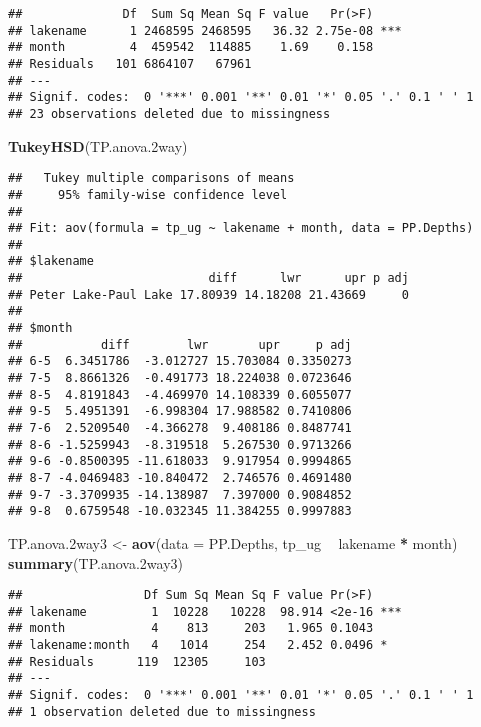 \documentclass[]{article}
\newenvironment{Shaded}{\begin{snugshade}}{\end{snugshade}}
\newcommand{\KeywordTok}[1]{\textcolor[rgb]{0.13,0.29,0.53}{\textbf{#1}}}
\newcommand{\DataTypeTok}[1]{\textcolor[rgb]{0.13,0.29,0.53}{#1}}
\newcommand{\StringTok}[1]{\textcolor[rgb]{0.31,0.60,0.02}{#1}}
\newcommand{\OperatorTok}[1]{\textcolor[rgb]{0.81,0.36,0.00}{\textbf{#1}}}
\newcommand{\NormalTok}[1]{#1}
\begin{document}
\begin{verbatim}
##              Df  Sum Sq Mean Sq F value   Pr(>F)    
## lakename      1 2468595 2468595   36.32 2.75e-08 ***
## month         4  459542  114885    1.69    0.158    
## Residuals   101 6864107   67961                     
## ---
## Signif. codes:  0 '***' 0.001 '**' 0.01 '*' 0.05 '.' 0.1 ' ' 1
## 23 observations deleted due to missingness
\end{verbatim}

\begin{Shaded}
\begin{Highlighting}[]
\KeywordTok{TukeyHSD}\NormalTok{(TP.anova.2way)}
\end{Highlighting}
\end{Shaded}

\begin{verbatim}
##   Tukey multiple comparisons of means
##     95% family-wise confidence level
## 
## Fit: aov(formula = tp_ug ~ lakename + month, data = PP.Depths)
## 
## $lakename
##                          diff      lwr      upr p adj
## Peter Lake-Paul Lake 17.80939 14.18208 21.43669     0
## 
## $month
##           diff        lwr       upr     p adj
## 6-5  6.3451786  -3.012727 15.703084 0.3350273
## 7-5  8.8661326  -0.491773 18.224038 0.0723646
## 8-5  4.8191843  -4.469970 14.108339 0.6055077
## 9-5  5.4951391  -6.998304 17.988582 0.7410806
## 7-6  2.5209540  -4.366278  9.408186 0.8487741
## 8-6 -1.5259943  -8.319518  5.267530 0.9713266
## 9-6 -0.8500395 -11.618033  9.917954 0.9994865
## 8-7 -4.0469483 -10.840472  2.746576 0.4691480
## 9-7 -3.3709935 -14.138987  7.397000 0.9084852
## 9-8  0.6759548 -10.032345 11.384255 0.9997883
\end{verbatim}

\begin{Shaded}
\begin{Highlighting}[]
\NormalTok{TP.anova.2way3 <-}\StringTok{ }\KeywordTok{aov}\NormalTok{(}\DataTypeTok{data =}\NormalTok{ PP.Depths, tp_ug }\OperatorTok{~}\StringTok{ }\NormalTok{lakename }\OperatorTok{*}\StringTok{ }\NormalTok{month)}
\KeywordTok{summary}\NormalTok{(TP.anova.2way3)}
\end{Highlighting}
\end{Shaded}

\begin{verbatim}
##                 Df Sum Sq Mean Sq F value Pr(>F)    
## lakename         1  10228   10228  98.914 <2e-16 ***
## month            4    813     203   1.965 0.1043    
## lakename:month   4   1014     254   2.452 0.0496 *  
## Residuals      119  12305     103                   
## ---
## Signif. codes:  0 '***' 0.001 '**' 0.01 '*' 0.05 '.' 0.1 ' ' 1
## 1 observation deleted due to missingness
\end{verbatim}
\end{document}
